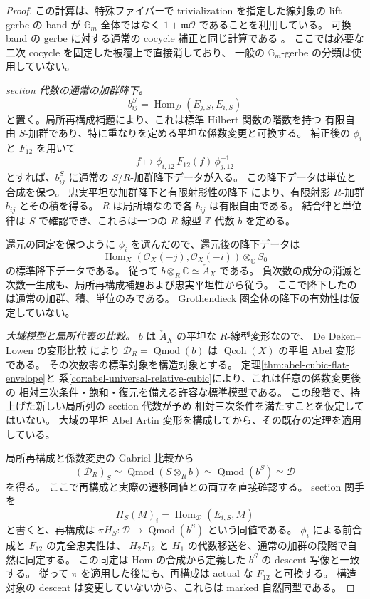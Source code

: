 \begin{proof}
この計算は、特殊ファイバーで trivialization を指定した線対象の lift gerbe の
band が $\mathbb G_m$ 全体ではなく $1+\mathfrak m\mathcal O$ であることを利用している。
可換 band の gerbe に対する通常の cocycle 補正と同じ計算である
\cite[Lemma~21.11.1]{StacksAbel}。
ここでは必要な二次 cocycle を固定した被覆上で直接消しており、
一般の $\mathbb G_m$-gerbe の分類は使用していない。

\emph{section 代数の通常の加群降下。}
\[
 b^S_{ij}=\operatorname{Hom}_{\mathcal D}(E_{j,S},E_{i,S})
\]
と置く。局所再構成補題により、これは標準 Hilbert 関数の階数を持つ
有限自由 $S$-加群であり、特に重なりを定める平坦な係数変更と可換する。
補正後の $\phi_i$ と $F_{12}$ を用いて
\[
 f\longmapsto\phi_{i,12}\,F_{12}(f)\,\phi_{j,12}^{-1}
\]
とすれば、$b^S_{ij}$ に通常の $S/R$-加群降下データが入る。
この降下データは単位と合成を保つ。
忠実平坦な加群降下と有限射影性の降下
\cite[Proposition~35.3.9, Tag~023N;
 Proposition~10.83.3, Tag~058S]{StacksAbel}
により、有限射影 $R$-加群 $b_{ij}$ とその積を得る。
$R$ は局所環なので各 $b_{ij}$ は有限自由である。
結合律と単位律は $S$ で確認でき、これらは一つの $R$-線型
$\mathbb Z$-代数 $b$ を定める。

還元の同定を保つように $\phi_i$ を選んだので、還元後の降下データは
\[
 \operatorname{Hom}_X(\mathcal O_X(-j),\mathcal O_X(-i))
       \otimes_{\mathbb C}S_0
\]
の標準降下データである。
従って $b\otimes_R\mathbb C\simeq\check A_X$ である。
負次数の成分の消滅と次数一生成も、局所再構成補題および忠実平坦性から従う。
ここで降下したのは通常の加群、積、単位のみである。
Grothendieck 圏全体の降下の有効性は仮定していない。

\emph{大域模型と局所代表の比較。}
$b$ は $\check A_X$ の平坦な $R$-線型変形なので、
De Deken--Lowen の変形比較
\cite[Theorem~4.5]{DeDekenLowen}
により $\mathcal D_R=\operatorname{Qmod}(b)$ は
$\operatorname{Qcoh}(X)$ の平坦 Abel 変形である。
その次数零の標準対象を構造対象とする。
定理\ref{thm:abel-cubic-flat-envelope}と
系\ref{cor:abel-universal-relative-cubic}により、これは任意の係数変更後の
相対三次条件・飽和・復元を備える許容な標準模型である。
この段階で、持上げた新しい局所列の section 代数が予め
相対三次条件を満たすことを仮定してはいない。
大域の平坦 Abel Artin 変形を構成してから、その既存の定理を適用している。

局所再構成と係数変更の Gabriel 比較から
\[
 (\mathcal D_R)_S
 \simeq\operatorname{Qmod}(S\otimes_R b)
 \simeq\operatorname{Qmod}(b^S)
 \simeq\mathcal D
\]
を得る。
ここで再構成と実際の遷移同値との両立を直接確認する。
section 関手を
\[
 H_S(M)_i=\operatorname{Hom}_{\mathcal D}(E_{i,S},M)
\]
と書くと、再構成は $\pi H_S:\mathcal D\to\operatorname{Qmod}(b^S)$
という同値である。
$\phi_i$ による前合成と $F_{12}$ の完全忠実性は、
$H_2F_{12}$ と $H_1$ の代数移送を、通常の加群の段階で自然に同定する。
この同定は Hom の合成から定義した $b^S$ の descent 写像と一致する。
従って $\pi$ を適用した後にも、再構成は actual な $F_{12}$ と可換する。
構造対象の descent は変更していないから、これらは marked 自然同型である。


\end{proof}
